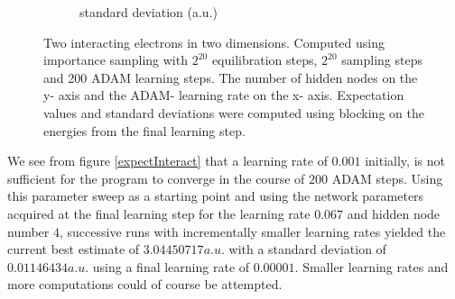 \documentclass[11pt,a4paper,titlepage]{article}
\begin{document}
\begin{figure}[H]
\begin{subfigure}{.5\textwidth}
\caption{standard deviation (a.u.)}\label{J2}
\end{subfigure}
\caption[Parameter sweep for two interacting electrons]{Two interacting electrons in two dimensions. Computed using importance sampling with $2^{20}$ equilibration steps, $2^{20}$ sampling steps and 200 ADAM learning steps. The number of hidden nodes on the y- axis and the ADAM- learning rate on the x- axis. Expectation values and standard deviations were computed using blocking on the energies from the final learning step.}
\label{fig:interacting_sweep}
\end{figure}
We see from figure \ref{expectInteract} that a learning rate of $0.001$ initially, is not sufficient for the program to converge in the course of $200$ ADAM steps. Using this parameter sweep as a starting point and using the network parameters acquired at the final learning step for the learning rate $0.067$ and hidden node number $4$, successive runs with incrementally  smaller learning rates yielded the current best estimate of $3.04450717a.u.$ with a standard deviation of $0.01146434a.u.$ using a final learning rate of $0.00001$. Smaller learning rates and more computations could of course be attempted.
\end{document}
